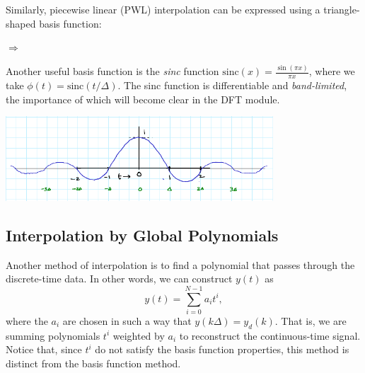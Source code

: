Similarly, piecewise linear (PWL) interpolation can be expressed using a triangle-shaped basis function:

\begin{center}
{\Huge $\Longrightarrow$}
\end{center}

Another useful basis function is the \emph{sinc} function $\text{sinc}(x)= \frac{\sin(\pi x)}{\pi x}$, where we take $\phi(t)=\text{sinc}(t/\Delta)$.
The sinc function is differentiable and \emph{band-limited}, the importance of which will become clear in the DFT module.

\begin{center}
\includegraphics[width=0.75\textwidth]{figs/sinc}
\end{center}


\subsection{Interpolation by Global Polynomials}

Another method of interpolation is to find a polynomial that passes through the discrete-time data. 
In other words, we can construct $y(t)$ as
\begin{equation*}
 y(t) = \sum_{i=0}^{N-1} a_i t^i,
\end{equation*}
where the $a_i$ are chosen in such a way that $y(k\Delta)=y_d(k)$. 
That is, we are summing polynomials $t^i$ weighted by $a_i$ to reconstruct the continuous-time signal.
Notice that, since $t^i$ do not satisfy the basis function properties, this method is distinct from the basis function method.

